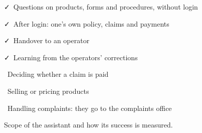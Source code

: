 \begin{figure}[H]
  \centering
  \newcommand\yes[1]{{\color{good}\faCheck}~#1\par}
  \newcommand\no[1]{{\color{bad}\faTimes}~#1\par}
  \newcommand\goal[1]{{\color{accent}\faBullseye}~#1\par}
  \begin{tcbraster}[raster columns=2, cardgrid, raster before skip=0pt]
    \begin{tcolorbox}[card, colframe=good!60]
      \yes{Questions on products, forms and procedures, without login}
      \yes{After login: one's own policy, claims and payments}
      \yes{Handover to an operator}
      \yes{Learning from the operators' corrections}
    \end{tcolorbox}
    \begin{tcolorbox}[card, colframe=bad!60]
      \no{Deciding whether a claim is paid}
      \no{Selling or pricing products}
      \no{Handling complaints: they go to the complaints office}
    \end{tcolorbox}
  \end{tcbraster}
  \caption{Scope of the assistant and how its success is measured.}
  \label{fig:intro-scope}
\end{figure}
